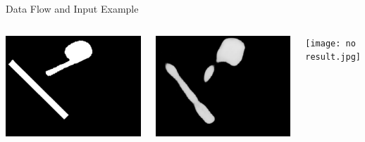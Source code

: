 \documentclass{beamer}
\begin{document}
\begin{frame}{Data Flow and Input Example}
\begin{columns}
\end{columns}

\begin{columns}
\centering
\includegraphics[width=0.95\linewidth]{target_9.jpg}

\centering 
\includegraphics[width=0.95\linewidth]{pred_9.png}

\centering
\texttt{[image: no result.jpg]}


\end{columns}


\end{frame}
\end{document}
